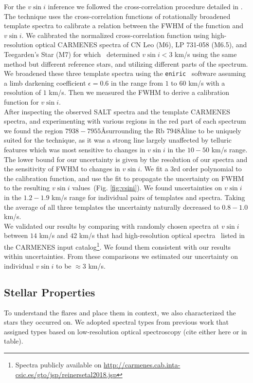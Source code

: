 \documentclass[fleqn,usenatbib,letters]{mnras}%
\begin{document}
For the $v\sin i$ inference we followed the cross-correlation procedure detailed in \citet{reiners2012}.
The technique uses the cross-correlation functions of rotationally broadened template spectra to calibrate a relation between the FWHM of the function and $v\sin i$. We calibrated the normalized cross-correlation function using high-resolution optical CARMENES spectra of CN Leo (M6), LP 731-058 (M6.5), and Teegarden's Star (M7) for which~\citet{reiners2018} determined $v\sin i < 3$ km/s using the same method but different reference stars, and utilizing different parts of the spectrum. We broadened these three template spectra using the \texttt{eniric}~\citep{neal2019} software assuming a limb darkening coefficient $\epsilon=0.6$ in the range from $1$ to $60$ km/s with a resolution of $1$ km/s. Then we measured the FWHM to derive a calibration function for $v\sin i$.
\\
After inspecting the observed SALT spectra and the template CARMENES spectra, and experimenting with various regions in the red part of each spectrum we found the region $7938-7955$\AA surrounding the Rb 7948\AA line to be uniquely suited for the technique, as it was a strong line largely unaffected by telluric features which was most sensitive to changes in $v\sin i$ in the $10-50$ km/s range. The lower bound for our uncertainty is given by the resolution of our spectra and the sensitivity of FWHM to changes in $v\sin i$. We fit a 3rd order polynomial to the calibration function, and use the fit to propagate the uncertainty on FWHM to the resulting $v\sin i$ values~(Fig. \ref{fig:vsini}). We found uncertainties on $v\sin i$ in the $1.2-1.9$ km/s range for individual pairs of templates and spectra. Taking the average of all three templates the uncertainty naturally decreased to $0.8-1.0$ km/s.
\\
We validated our results by comparing with randomly chosen spectra at $v\sin i$ between $14$ km/s and $42$ km/s that had high-resolution optical spectra~\citep{reiners2018} listed in the CARMENES input catalog\citep{jeffers2018}\footnote{Spectra publicly available on \url{http://carmenes.cab.inta-csic.es/gto/jsp/reinersetal2018.jsp}}. We found them consistent with our results within uncertainties. From these comparisons we estimated our uncertainty on individual $v\sin i$ to be $\approx 3$ km/s.

\subsection{Stellar Properties}
\label{sec:props}
To understand the flares and place them in context, we also characterized the stars they occurred on. We adopted spectral types from previous work that assigned types based on low-resolution optical spectroscopy (cite either here or in table).
\end{document}
